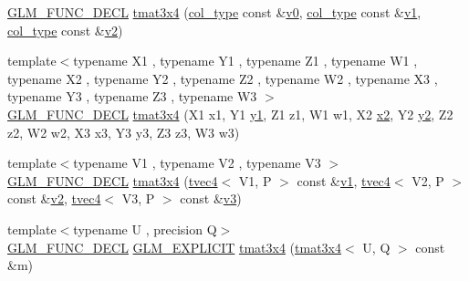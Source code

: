 \begin{DoxyCompactItemize}
\item 
\mbox{\hyperlink{setup_8hpp_ab2d052de21a70539923e9bcbf6e83a51}{G\+L\+M\+\_\+\+F\+U\+N\+C\+\_\+\+D\+E\+CL}} \mbox{\hyperlink{structglm_1_1tmat3x4_a80f60a03121cb766e5397ab56ac3e356}{tmat3x4}} (\mbox{\hyperlink{structglm_1_1tmat3x4_aa4c8d5353d59216a2f0566ce462fbc81}{col\+\_\+type}} const \&\mbox{\hyperlink{glad_8h_a7062a23d1d434121d4a88f530703d06a}{v0}}, \mbox{\hyperlink{structglm_1_1tmat3x4_aa4c8d5353d59216a2f0566ce462fbc81}{col\+\_\+type}} const \&\mbox{\hyperlink{glad_8h_a0779c3b73f9aa3a0ac5b0139b5d291d9}{v1}}, \mbox{\hyperlink{structglm_1_1tmat3x4_aa4c8d5353d59216a2f0566ce462fbc81}{col\+\_\+type}} const \&\mbox{\hyperlink{glad_8h_a9a09a1837922b2b806f4589096a52049}{v2}})
\item 
{\footnotesize template$<$typename X1 , typename Y1 , typename Z1 , typename W1 , typename X2 , typename Y2 , typename Z2 , typename W2 , typename X3 , typename Y3 , typename Z3 , typename W3 $>$ }\\\mbox{\hyperlink{setup_8hpp_ab2d052de21a70539923e9bcbf6e83a51}{G\+L\+M\+\_\+\+F\+U\+N\+C\+\_\+\+D\+E\+CL}} \mbox{\hyperlink{structglm_1_1tmat3x4_aa797d8de2ec5784a9e29776f66998c9f}{tmat3x4}} (X1 x1, Y1 \mbox{\hyperlink{glad_8h_a48340161068d267815ac3131e9d03def}{y1}}, Z1 z1, W1 w1, X2 \mbox{\hyperlink{glad_8h_ad2cea6eadb01f017f0d57e7edf0ce988}{x2}}, Y2 \mbox{\hyperlink{glad_8h_af7158b5d27f7a6aa4ab9973fcc3a5c20}{y2}}, Z2 z2, W2 w2, X3 x3, Y3 y3, Z3 z3, W3 w3)
\item 
{\footnotesize template$<$typename V1 , typename V2 , typename V3 $>$ }\\\mbox{\hyperlink{setup_8hpp_ab2d052de21a70539923e9bcbf6e83a51}{G\+L\+M\+\_\+\+F\+U\+N\+C\+\_\+\+D\+E\+CL}} \mbox{\hyperlink{structglm_1_1tmat3x4_a79898618d22d01dd865e88d61aaf9016}{tmat3x4}} (\mbox{\hyperlink{structglm_1_1tvec4}{tvec4}}$<$ V1, P $>$ const \&\mbox{\hyperlink{glad_8h_a0779c3b73f9aa3a0ac5b0139b5d291d9}{v1}}, \mbox{\hyperlink{structglm_1_1tvec4}{tvec4}}$<$ V2, P $>$ const \&\mbox{\hyperlink{glad_8h_a9a09a1837922b2b806f4589096a52049}{v2}}, \mbox{\hyperlink{structglm_1_1tvec4}{tvec4}}$<$ V3, P $>$ const \&\mbox{\hyperlink{glad_8h_acc806b31cbf466ceba6555983d8b814d}{v3}})
\item 
{\footnotesize template$<$typename U , precision Q$>$ }\\\mbox{\hyperlink{setup_8hpp_ab2d052de21a70539923e9bcbf6e83a51}{G\+L\+M\+\_\+\+F\+U\+N\+C\+\_\+\+D\+E\+CL}} \mbox{\hyperlink{setup_8hpp_a6c74f5a5e7b134ab69023ff9a30d4d5d}{G\+L\+M\+\_\+\+E\+X\+P\+L\+I\+C\+IT}} \mbox{\hyperlink{structglm_1_1tmat3x4_a605d52801a88671ed149ac1580f913aa}{tmat3x4}} (\mbox{\hyperlink{structglm_1_1tmat3x4}{tmat3x4}}$<$ U, Q $>$ const \&m)

\end{DoxyCompactItemize}
